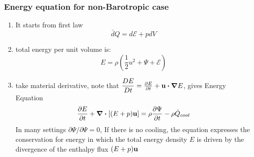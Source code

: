 \documentclass[12pt,a4paper]{article}
\begin{document}
    \subsubsection{Energy equation for non-Barotropic case}
        \begin{enumerate}
            \item It starts from first law
            \begin{equation}
                \bar{d}Q = d \mathcal{E} + pdV
            \end{equation}
            \item total energy per unit volume is:
            \begin{equation}
                E=\rho(\frac{1}{2}u^2 +\Psi + \mathcal{E})
            \end{equation}
            \item take material derivative, note that $\dfrac{DE}{Dt}=\pdv{E}{t}+\vb{u}\dotproduct\grad{E}$, gives Energy Equation
            \begin{equation}
                \pdv{E}{t}+\div{[(E+p)\vb{u}]= \rho\pdv{\Psi}{t}-\rho \dot{Q}_{cool}}
            \end{equation}
            In many settings $\partial{\Psi}/\partial{\Psi}=0$, If there is no cooling, the equation expresses the conservation for energy in which
            the total energy density $E$ is driven by the divergence of the enthalpy flux $(E+p)\vb{u}$
        \end{enumerate}
        
\end{document}

